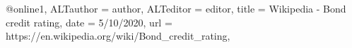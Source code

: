 @online{1,
	ALTauthor = {author},
	ALTeditor = {editor},
	title = {Wikipedia - Bond credit rating},
	date = {5/10/2020},
	url = {https://en.wikipedia.org/wiki/Bond_credit_rating},
}
